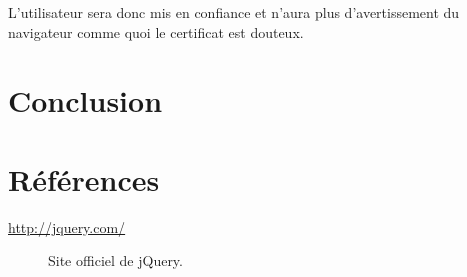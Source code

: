 \documentclass[10pt,a4paper,titlepage]{article}
\begin{document}
L'utilisateur sera donc mis en confiance et n'aura plus d'avertissement du navigateur comme quoi le certificat est douteux. 

\section{Conclusion}



\section{Références}

\small
\begin{description}
	\item[\url{http://jquery.com/}] {Site officiel de jQuery.}
\end{description}
\end{document}
